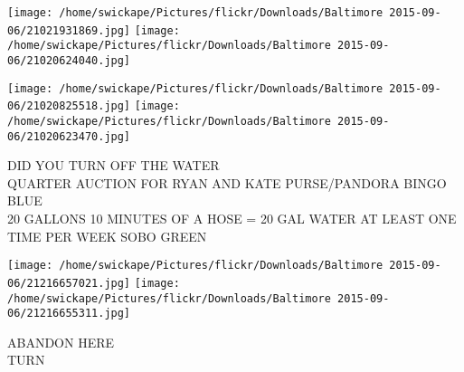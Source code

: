\documentclass[10pt,letterpaper]{article}
\begin{document}
\texttt{[image: /home/swickape/Pictures/flickr/Downloads/Baltimore 2015-09-06/21021931869.jpg]}
\texttt{[image: /home/swickape/Pictures/flickr/Downloads/Baltimore 2015-09-06/21020624040.jpg]}

\texttt{[image: /home/swickape/Pictures/flickr/Downloads/Baltimore 2015-09-06/21020825518.jpg]}
\texttt{[image: /home/swickape/Pictures/flickr/Downloads/Baltimore 2015-09-06/21020623470.jpg]}

DID YOU TURN OFF THE WATER\\
QUARTER AUCTION FOR RYAN AND KATE PURSE/PANDORA BINGO\\
BLUE\\
20 GALLONS 10 MINUTES OF A HOSE = 20 GAL WATER AT LEAST ONE TIME PER WEEK SOBO GREEN
\pagebreak

\texttt{[image: /home/swickape/Pictures/flickr/Downloads/Baltimore 2015-09-06/21216657021.jpg]}
\texttt{[image: /home/swickape/Pictures/flickr/Downloads/Baltimore 2015-09-06/21216655311.jpg]}

ABANDON HERE\\
TURN
\pagebreak
\end{document}
